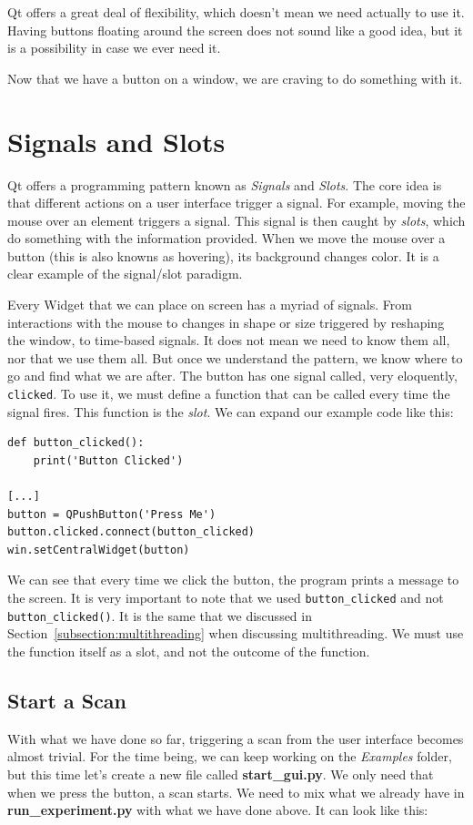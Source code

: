 Qt offers a great deal of flexibility, which doesn't mean we need actually to use it. Having buttons floating around the screen does not sound like a good idea, but it is a possibility in case we ever need it.

Now that we have a button on a window, we are craving to do something with it.


\section{Signals and Slots}\label{sec:signals-slots}
Qt offers a programming pattern known as \emph{Signals} and \emph{Slots}. The core idea is that different actions on a user interface trigger a signal. For example, moving the mouse over an element triggers a signal. This signal is then caught by \emph{slots}, which do something with the information provided. When we move the mouse over a button (this is also knowns as hovering), its background changes color. It is a clear example of the signal/slot paradigm.

Every Widget that we can place on screen has a myriad of signals. From interactions with the mouse to changes in shape or size triggered by reshaping the window, to time-based signals. It does not mean we need to know them all, nor that we use them all. But once we understand the pattern, we know where to go and find what we are after. The button has one signal called, very eloquently, \texttt{clicked}. To use it, we must define a function that can be called every time the signal fires. This function is the \emph{slot}. We can expand our example code like this:

\begin{verbatim}
def button_clicked():
    print('Button Clicked')

[...]
button = QPushButton('Press Me')
button.clicked.connect(button_clicked)
win.setCentralWidget(button)
\end{verbatim}

We can see that every time we click the button, the program prints a message to the screen. It is very important to note that we used \texttt{button\_clicked} and not \texttt{button\_clicked()}. It is the same that we discussed in Section~\ref{subsection:multithreading} when discussing multithreading. We must use the function itself as a slot, and not the outcome of the function.

\subsection{Start a Scan}\label{subsec:start-scan-gui}
With what we have done so far, triggering a scan from the user interface becomes almost trivial. For the time being, we can keep working on the \emph{Examples} folder, but this time let's create a new file called \textbf{start\_gui.py}. We only need that when we press the button, a scan starts. We need to mix what we already have in \textbf{run\_experiment.py} with what we have done above. It can look like this:

